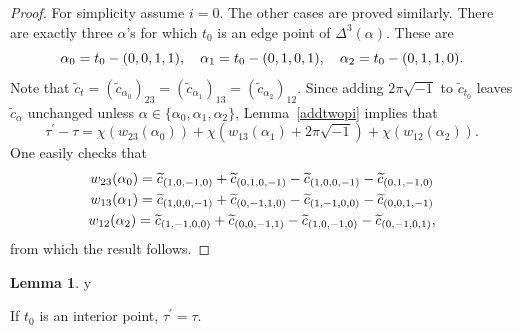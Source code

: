 \documentclass[11pt]{amsart}
\theoremstyle{definition}
\newtheorem{lemma}[theorem]{Lemma}
\numberwithin{equation}{section}
\def\printname#1{
        \if\draft y
                \smash{\makebox[0pt]{\hspace{-0.5in}
                        \raisebox{8pt}{\tt\tiny #1}}}
        \fi
}
\def\lbl#1{\label{#1}\printname{#1}}
\begin{document}
\begin{proof}
For simplicity assume $i=0$. The other cases are proved similarly.
There are exactly three $\alpha$'s for which $t_0$ is an edge point of 
$\Delta^3(\alpha)$. These are
\begin{equation}
\lbl{alphais}
\alpha_0=t_0-(0,0,1,1),\quad\alpha_1=t_0-(0,1,0,1),\quad\alpha_2=t_0-(0,1,1,0).
\end{equation}  
Note that $\widetilde c_t=(\widetilde c_{\alpha_0})_{23}
=(\widetilde c_{\alpha_1})_{13}=(\widetilde c_{\alpha_2})_{12}$.
Since adding $2\pi\sqrt{-1}$ to $\widetilde c_{t_0}$ leaves $\widetilde c_\alpha$ unchanged unless $\alpha\in\{\alpha_0,\alpha_1,\alpha_2\}$, Lemma~\ref{addtwopi} implies that
\begin{equation}
\tau^\prime-\tau=\chi(w_{23}(\alpha_0))+\chi(w_{13}(\alpha_1)+2\pi\sqrt{-1})+\chi(w_{12}(\alpha_2)).
\end{equation}
One easily checks that
\begin{equation}
\lbl{firstthree}
\begin{gathered}
w_{23}(\alpha_0)=\widetilde c_{(1,0,-1,0)}+\widetilde c_{(0,1,0,-1)}-\widetilde c_{(1,0,0,-1)}-\widetilde c_{(0,1,-1,0)}\\
w_{13}(\alpha_1)=\widetilde c_{(1,0,0,-1)}+\widetilde c_{(0,-1,1,0)}-\widetilde c_{(1,-1,0,0)}-\widetilde c_{(0,0,1,-1)}\\
w_{12}(\alpha_2)=\widetilde c_{(1,-1,0,0)}+\widetilde c_{(0,0,-1,1)}-\widetilde c_{(1,0,-1,0)}-\widetilde c_{(0,-1,0,1)},
\end{gathered}
\end{equation}
from which the result follows.
\end{proof}

\begin{lemma}
\lbl{interiorpoint} 
If $t_0$ is an interior point, $\tau^\prime=\tau$.
\end{lemma}
\end{document}
